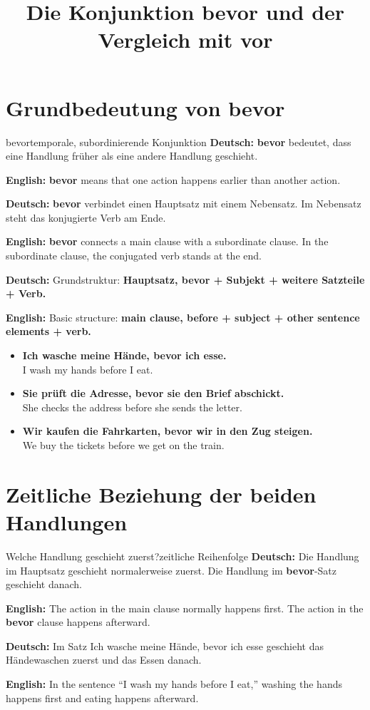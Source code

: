 \documentclass[a4paper,11pt]{article}
\title{Die Konjunktion \glqq bevor\grqq{} und der Vergleich mit \glqq vor\grqq}
\date{}
\newcommand{\GermanText}[1]{\textbf{Deutsch: }#1\par}
\newcommand{\EnglishText}[1]{{\small\color{SoftGray}\textbf{English: }#1\par}}
\newcommand{\ExampleItem}[2]{\item \textbf{#1}\\{\small\color{SoftGray}#2}}
\begin{document}
    \maketitle
    \tableofcontents
    \newpage

    \section{Grundbedeutung von \glqq bevor\grqq}

        \begin{grammarentry}{bevor}{temporale, subordinierende Konjunktion}
            \GermanText{\textbf{bevor} bedeutet, dass eine Handlung früher als eine andere Handlung geschieht.}
            \EnglishText{\textbf{bevor} means that one action happens earlier than another action.}

            \GermanText{\textbf{bevor} verbindet einen Hauptsatz mit einem Nebensatz. Im Nebensatz steht das konjugierte Verb am Ende.}
            \EnglishText{\textbf{bevor} connects a main clause with a subordinate clause. In the subordinate clause, the conjugated verb stands at the end.}

            \GermanText{Grundstruktur: \textbf{Hauptsatz, bevor + Subjekt + weitere Satzteile + Verb.}}
            \EnglishText{Basic structure: \textbf{main clause, before + subject + other sentence elements + verb.}}
        \end{grammarentry}

        \begin{exbox}
            \begin{itemize}
                \ExampleItem{Ich wasche meine Hände, bevor ich esse.}{I wash my hands before I eat.}
                \ExampleItem{Sie prüft die Adresse, bevor sie den Brief abschickt.}{She checks the address before she sends the letter.}
                \ExampleItem{Wir kaufen die Fahrkarten, bevor wir in den Zug steigen.}{We buy the tickets before we get on the train.}
            \end{itemize}
        \end{exbox}

    \section{Zeitliche Beziehung der beiden Handlungen}

        \begin{grammarentry}{Welche Handlung geschieht zuerst?}{zeitliche Reihenfolge}
            \GermanText{Die Handlung im Hauptsatz geschieht normalerweise zuerst. Die Handlung im \textbf{bevor}-Satz geschieht danach.}
            \EnglishText{The action in the main clause normally happens first. The action in the \textbf{bevor} clause happens afterward.}

            \GermanText{Im Satz \glqq Ich wasche meine Hände, bevor ich esse\grqq{} geschieht das Händewaschen zuerst und das Essen danach.}
            \EnglishText{In the sentence ``I wash my hands before I eat,'' washing the hands happens first and eating happens afterward.}
        \end{grammarentry}
\end{document}
